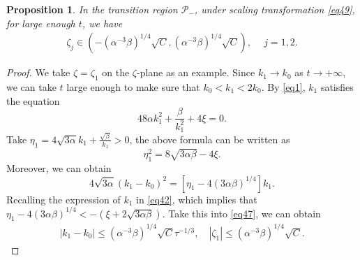 \documentclass[11pt]{article}
\numberwithin{equation}{section}
\newtheorem{Proposition}{Proposition}
\begin{document}
\begin{Proposition}\label{p23}
     In the transition region  $\mathcal{P}_{-}$, under scaling transformation \eqref{eq49}, for large enough $t$, we have
  \begin{align}
 \zeta_j\in ( -\left(\alpha^{-3}\beta\right)^{1/4} \sqrt{C}, \left(\alpha^{-3}\beta\right)^{1/4}  \sqrt{C}), \quad \ j=1, 2.
        \end{align}
\end{Proposition}
\begin{proof}
    We take $\zeta=\zeta_1$ on the $\zeta$-plane as an example. Since $k_1\to k_0$ as $t\to +\infty$, we can take $t$ large enough to make sure that $k_0<k_1<2k_0$. By \eqref{eq1}, $k_1$ satisfies the equation
    \begin{equation*}
        48\alpha k_1^2+\frac{\beta}{k_1^2}+4\xi=0.
    \end{equation*}
Take $\eta_1=4\sqrt{3\alpha}k_1+\frac{\sqrt{\beta}}{k_1}>0$, the above formula can be written as
\begin{equation}
\eta_1^2=8\sqrt{3\alpha \beta}-4\xi.
\end{equation}
Moreover, we can obtain
\begin{equation}\label{eq47}
    4\sqrt{3\alpha}(k_1-k_0)^2=\left[\eta_1-4(3\alpha\beta)^{1/4}\right]k_1.
\end{equation}
Recalling the expression of $k_1$ in \eqref{eq42}, which implies that
$\eta_1-4(3\alpha\beta)^{1/4}<-\left(\xi+2\sqrt{3\alpha\beta}\right)$. Take this into \eqref{eq47}, we can obtain
\begin{align*}
    |k_1-k_0|\leqslant \left(\alpha^{-3}\beta\right)^{1/4} \sqrt{C} \tau^{-1/3},\quad| \zeta_1|\leqslant \left(\alpha^{-3}\beta\right)^{1/4} \sqrt{C}.
\end{align*}


\end{proof}
\end{document}
